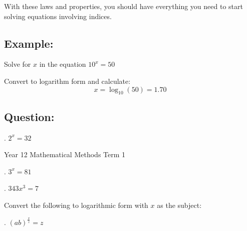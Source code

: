 \documentclass[12pt]{article}
\begin{document}
\noindent With these laws and properties, you should have everything you need to start solving equations involving indices.

\subsection*{Example:}
\noindent Solve for \(x\) in the equation \(10^x = 50\) 

\noindent Convert to logarithm form and calculate:
\[x = \log_{10}(50) = 1.70\] 

\subsection*{Question:}
. \(2^x = 32\) 
\vspace{10mm} %
\noindent \makebox[\linewidth]{\dotfill} %
\vspace{10mm}
\noindent \makebox[\linewidth]{\dotfill}
\vspace{10mm}
\noindent \makebox[\linewidth]{\dotfill}

\vfill %
\flushleft


\newpage %

\noindent Year 12 Mathematical Methods \hfill Term 1


\vspace{10mm}. \(3^x = 81\)
\vspace{10mm} %
\noindent \makebox[\linewidth]{\dotfill} %
\vspace{10mm}
\noindent \makebox[\linewidth]{\dotfill}
\vspace{10mm}
\noindent \makebox[\linewidth]{\dotfill}

. \(343x^3 = 7\)
\vspace{10mm} %
\noindent \makebox[\linewidth]{\dotfill} %
\vspace{10mm}
\noindent \makebox[\linewidth]{\dotfill}
\vspace{10mm}
\noindent \makebox[\linewidth]{\dotfill}

\noindent Convert the following to logarithmic form with \(x\) as the subject:

\vspace{5mm} %
. \((ab)^{\frac{x}{z}} = z\)
\vspace{10mm} %
\noindent \makebox[\linewidth]{\dotfill} %
\vspace{10mm}
\noindent \makebox[\linewidth]{\dotfill}
\vspace{10mm}
\noindent \makebox[\linewidth]{\dotfill}
\end{document}

